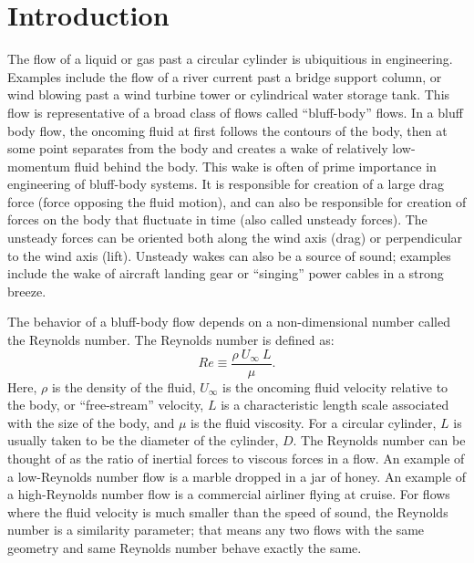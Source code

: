 \documentclass{article}
\begin{document}
\section*{Introduction}
The flow of a liquid or gas past a circular cylinder is ubiquitious in
engineering.  Examples include the flow of a river current past a
bridge support column, or wind blowing past a wind turbine tower or
cylindrical water storage tank.  This flow is representative of a
broad class of flows called ``bluff-body'' flows. In a bluff body
flow, the oncoming fluid at first follows the contours of the body,
then at some point separates from the body and creates a wake of
relatively low-momentum fluid behind the body.  This wake is often of
prime importance in engineering of bluff-body systems.  It is
responsible for creation of a large drag force (force opposing the
fluid motion), and can also be responsible for creation of forces on
the body that fluctuate in time (also called unsteady forces).  The
unsteady forces can be oriented both along the wind axis (drag) or
perpendicular to the wind axis (lift).  Unsteady wakes can also be a
source of sound; examples include the wake of aircraft landing gear or
``singing'' power cables in a strong breeze.

The behavior of a bluff-body flow depends on a non-dimensional number
called the Reynolds number.  The Reynolds number is defined as:
\begin{equation}
Re \equiv \frac{\rho~U_\infty~L}{\mu}.
\end{equation}
Here, $\rho$ is the density of the fluid, $U_\infty$ is the oncoming 
fluid velocity relative to the body, or ``free-stream'' velocity, $L$
is a characteristic length scale associated with the size of the body,
and $\mu$ is the fluid viscosity.  For a circular cylinder, $L$ is
usually taken to be the diameter of the cylinder, $D$.  The Reynolds number
can be thought of as the ratio of inertial forces to viscous forces in
a flow.  An example of a low-Reynolds number flow is a marble
dropped in a jar of honey.  An example of a high-Reynolds number flow
is a commercial airliner flying at cruise.  For flows where the
fluid velocity is much smaller than the speed of sound, the Reynolds
number is a similarity parameter; that means any two flows with the
same geometry and same Reynolds number behave exactly the same.
\end{document}
